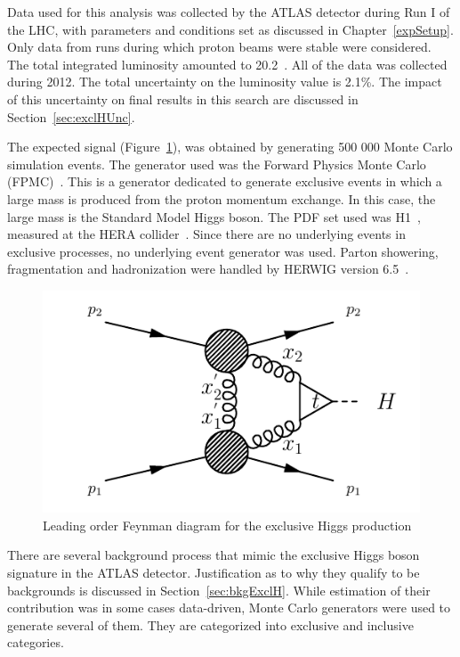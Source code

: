 \par Data used for this analysis was collected by the ATLAS detector during Run I 
of the LHC, with parameters and conditions set as discussed 
in Chapter~\ref{expSetup}. Only data from runs during which proton beams were stable were considered. 
The total integrated luminosity amounted to 20.2~\ifb. All of the data was collected 
during 2012. The total uncertainty on the luminosity value is 2.1\%. The impact of this uncertainty on  
final results in this search are discussed in Section~\ref{sec:exclHUnc}.  

\par The expected signal (Figure~\ref{fig:exclHb}), was obtained by generating 500 000 Monte Carlo 
simulation events. The generator used  
was the Forward Physics Monte Carlo (FPMC)~\cite{fpmc}. This is a generator dedicated to generate 
exclusive events in which a large mass is produced from the proton momentum exchange. In this case, the 
large mass is the Standard Model Higgs boson. The PDF set used was H1~\cite{Aktas:2006hy},
measured at the HERA collider~\cite{Klein:2008di}. Since there are no underlying events in exclusive 
processes, no underlying event generator was used. Parton showering, fragmentation and hadronization were 
handled by HERWIG version 6.5~\cite{Herwig6.5}. 

\begin{figure}[!h]
\centering
\includegraphics[width=0.8\linewidth]{figures/exclH.pdf}
\caption{Leading order Feynman diagram for the exclusive Higgs production} 
\label{fig:exclHb}
\end{figure}

\par There are several background process that mimic the exclusive Higgs boson signature in the 
ATLAS detector. Justification as to why they qualify to be backgrounds is discussed in Section~\ref{sec:bkgExclH}. 
While estimation of their contribution was in some cases data-driven, Monte Carlo generators were 
used to generate several of them. They are categorized into exclusive and inclusive categories.   

